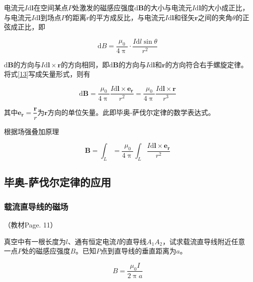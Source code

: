 \documentclass[
	12pt, %
	a4paper, %
]{myLegrandOrangeBook}
\newcommand{\rmd}{\mathrm{d}}
\begin{document}
\begin{theorem}[毕奥-萨伐尔定律]
电流元\(I \rmd \mathbf{l}\)在空间某点\(P\)处激发的磁感应强度\(\rmd \mathbf{B}\)的大小与电流元\(I\rmd \mathbf{l}\)的大小成正比，与电流元\(I\rmd \mathbf{l}\)到场点\(P\)的距离\(r\)的平方成反比，与电流元\(I\rmd \mathbf{l}\)和径矢\(\mathbf{r}\)之间的夹角\(\theta\)的正弦成正比，即

\begin{equation}
    \rmd B = \frac{\mu_0}{4 \uppi} \cdot \frac{I \rmd l \sin \theta}{r^2}
    \label{13}
\end{equation}

\(\rmd \mathbf{B}\)的方向与\(I \rmd \mathbf{l} \times \mathbf{r}\)的方向相同，即\(\rmd \mathbf{B}\)的方向与\(I \rmd \mathbf{l}\)和\(\mathbf{r}\)的方向符合右手螺旋定律。将式\ref{13}写成矢量形式，则有

\begin{equation}
    \rmd \mathbf{B} = \frac{\mu_0}{4 \uppi} \frac{I \rmd \mathbf{l} \times \mathbf{e_r}}{r^2} = \frac{\mu_0}{4 \uppi} \frac{I \rmd \mathbf{l} \times \mathbf{r}}{r^3}
\end{equation}

其中\(\mathbf{e_r} = \dfrac{\mathbf{r}}{r}\)为\(\mathbf{r}\)方向的单位矢量。此即毕奥-萨伐尔定律的数学表达式。

根据场强叠加原理

\begin{equation}
    \mathbf{B} =\int_{L} = \frac{\mu_0}{4 \uppi} \int_L \frac{I \rmd \mathbf{l} \times \mathbf{e_r}}{r^2}
\end{equation}
\end{theorem}

\subsection{毕奥-萨伐尔定律的应用}

\subsubsection{载流直导线的磁场}

（教材Page. 11）

真空中有一根长度为\(l\)、通有恒定电流\(I\)的直导线\(A_1A_2\)，试求载流直导线附近任意一点\(P\)处的磁感应强度\(B\)。已知\(P\)点到直导线的垂直距离为\(a\)。

\begin{equation}
    B = \frac{\mu_0 I}{2 \uppi a}
\end{equation}
\end{document}
